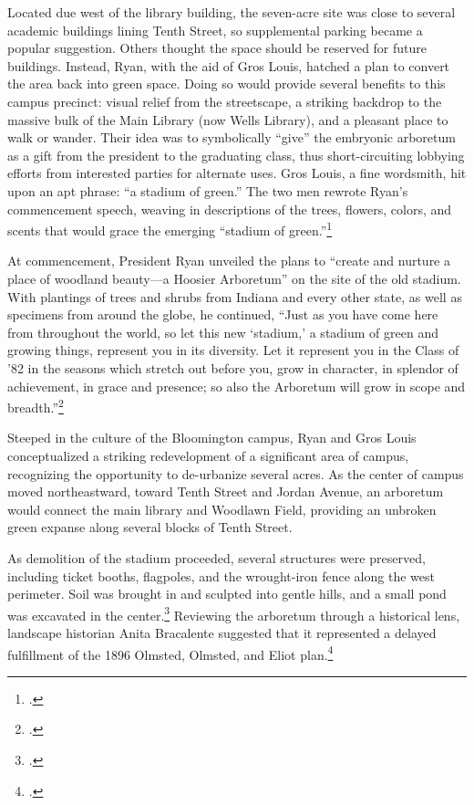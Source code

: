 \documentclass[
  american,
  letterpaper,
]{scrreprt}
\begin{document}
Located due west of the library building, the seven-acre site was close
to several academic buildings lining Tenth Street, so supplemental
parking became a popular suggestion. Others thought the space should be
reserved for future buildings. Instead, Ryan, with the aid of Gros
Louis, hatched a plan to convert the area back into green space. Doing
so would provide several benefits to this campus precinct: visual relief
from the streetscape, a striking backdrop to the massive bulk of the
Main Library (now Wells Library), and a pleasant place to walk or
wander. Their idea was to symbolically ``give'' the embryonic arboretum
as a gift from the president to the graduating class, thus
short-circuiting lobbying efforts from interested parties for alternate
uses. Gros Louis, a fine wordsmith, hit upon an apt phrase: ``a stadium
of green.'' The two men rewrote Ryan's commencement speech, weaving in
descriptions of the trees, flowers, colors, and scents that would grace
the emerging ``stadium of green.''\footnote{.}

At commencement, President Ryan unveiled the plans to ``create and
nurture a place of woodland beauty---a Hoosier Arboretum'' on the site
of the old stadium. With plantings of trees and shrubs from Indiana and
every other state, as well as specimens from around the globe, he
continued, ``Just as you have come here from throughout the world, so
let this new `stadium,' a stadium of green and growing things, represent
you in its diversity. Let it represent you in the Class of '82 in the
seasons which stretch out before you, grow in character, in splendor of
achievement, in grace and presence; so also the Arboretum will grow in
scope and breadth.''\footnote{.}

Steeped in the culture of the Bloomington campus, Ryan and Gros Louis
conceptualized a striking redevelopment of a significant area of campus,
recognizing the opportunity to de-urbanize several acres. As the center
of campus moved northeastward, toward Tenth Street and Jordan Avenue, an
arboretum would connect the main library and Woodlawn Field, providing
an unbroken green expanse along several blocks of Tenth Street.

As demolition of the stadium proceeded, several structures were
preserved, including ticket booths, flagpoles, and the wrought-iron
fence along the west perimeter. Soil was brought in and sculpted into
gentle hills, and a small pond was excavated in the center.\footnote{.} Reviewing the
arboretum through a historical lens, landscape historian Anita
Bracalente suggested that it represented a delayed fulfillment of the
1896 Olmsted, Olmsted, and Eliot plan.\footnote{.}
\end{document}
